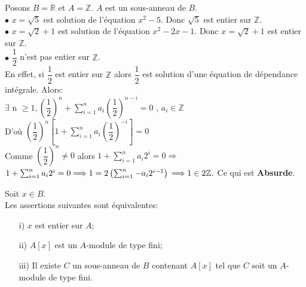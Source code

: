 \begin{monexemple}
	Posons $B = \mathbb{R}$ et $A = \mathbb{Z}$. $A$ est un sous-anneau de $B$.\\
	$\bullet$ $x = \sqrt{5}$ est solution de l'équation $x^2 - 5$. Donc $\sqrt{5}$ est entier sur $\mathbb{Z}$.\\
	$\bullet$ $x = \sqrt{2}+1$ est solution de l'équation $x^2 - 2x -1$. Donc $x = \sqrt{2}+1$ est entier sur $\mathbb{Z}$.\\
	$\bullet$ $\dfrac{1}{2}$ n'est pas entier sur $\mathbb{Z}$.\\
	En effet, si $\dfrac{1}{2}$ est entier sur $\mathbb{Z}$ alors $\dfrac{1}{2}$ est solution d'une équation de dépendance intégrale. Alors: \\
	$\exists$ n $\geq 1 , \left(\dfrac{1}{2} \right)^n + \sum_{i=1}^{n} a_i \left(\dfrac{1}{2} \right)^{n-i} = 0$ , $a_i \in\mathbb{Z}$\\
	D'où $\left(\dfrac{1}{2} \right)^n \left[1+\sum_{i=1}^{n} a_i \left(\dfrac{1}{2} \right)^{-i}\right] = 0$\\
	Comme $\left(\dfrac{1}{2} \right)^n \neq 0$ alors $1+\sum_{i=1}^{n} a_i2^{i} = 0\Longrightarrow$ $1+\sum_{i=1}^{n} a_i2^{i} = 0 \Longrightarrow 1 = 2\left(\sum_{i=1}^{n} -a_i 2^{i-1}\right)\\ \Longrightarrow 1\in 2\mathbb{Z}.$ Ce qui est \textbf{Absurde}. 
\end{monexemple}
\begin{maproposition}
	Soit $x \in B$. \\
	Les assertions suivantes sont équivalentes:\\
	\begin{enumerate}
		\item[i)]$x$ est entier sur $A$;\\
		\item[ii)]$A\left[ x\right]$ est un $A$-module de type fini;\\
		\item[iii)]Il existe $C$ un sous-anneau de $B$ contenant $A\left[ x\right]$ tel que $C$ soit un $A$-module de type fini.
	\end{enumerate}
\end{maproposition}
